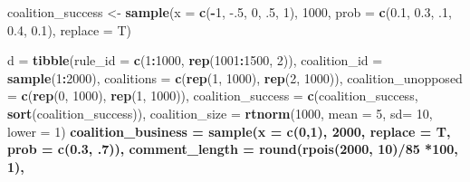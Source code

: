 \documentclass[
      12pt,
        ]{article}
\newenvironment{Shaded}{\begin{snugshade}}{\end{snugshade}}
\newcommand{\DataTypeTok}[1]{\textcolor[rgb]{0.13,0.29,0.53}{#1}}
\newcommand{\DecValTok}[1]{\textcolor[rgb]{0.00,0.00,0.81}{#1}}
\newcommand{\FloatTok}[1]{\textcolor[rgb]{0.00,0.00,0.81}{#1}}
\newcommand{\KeywordTok}[1]{\textcolor[rgb]{0.13,0.29,0.53}{\textbf{#1}}}
\newcommand{\NormalTok}[1]{#1}
\newcommand{\OperatorTok}[1]{\textcolor[rgb]{0.81,0.36,0.00}{\textbf{#1}}}
\newcommand{\StringTok}[1]{\textcolor[rgb]{0.31,0.60,0.02}{#1}}
\begin{document}
\begin{Shaded}
\begin{Highlighting}[]
\NormalTok{coalition_success <-}\StringTok{ }\KeywordTok{sample}\NormalTok{(}\DataTypeTok{x =} \KeywordTok{c}\NormalTok{(}\OperatorTok{-}\DecValTok{1}\NormalTok{, }\FloatTok{-.5}\NormalTok{, }\DecValTok{0}\NormalTok{, }\FloatTok{.5}\NormalTok{, }\DecValTok{1}\NormalTok{), }\DecValTok{1000}\NormalTok{, }\DataTypeTok{prob =} \KeywordTok{c}\NormalTok{(}\FloatTok{0.1}\NormalTok{, }\FloatTok{0.3}\NormalTok{, }\FloatTok{.1}\NormalTok{, }\FloatTok{0.4}\NormalTok{, }\FloatTok{0.1}\NormalTok{), }\DataTypeTok{replace =}\NormalTok{ T)}

\NormalTok{d =}\StringTok{ }\KeywordTok{tibble}\NormalTok{(}\DataTypeTok{rule_id =} \KeywordTok{c}\NormalTok{(}\DecValTok{1}\OperatorTok{:}\DecValTok{1000}\NormalTok{, }\KeywordTok{rep}\NormalTok{(}\DecValTok{1001}\OperatorTok{:}\DecValTok{1500}\NormalTok{, }\DecValTok{2}\NormalTok{)),}
           \DataTypeTok{coalition_id =} \KeywordTok{sample}\NormalTok{(}\DecValTok{1}\OperatorTok{:}\DecValTok{2000}\NormalTok{),}
           \DataTypeTok{coalitions  =} \KeywordTok{c}\NormalTok{(}\KeywordTok{rep}\NormalTok{(}\DecValTok{1}\NormalTok{, }\DecValTok{1000}\NormalTok{), }\KeywordTok{rep}\NormalTok{(}\DecValTok{2}\NormalTok{, }\DecValTok{1000}\NormalTok{)),}
           \DataTypeTok{coalition_unopposed =} \KeywordTok{c}\NormalTok{(}\KeywordTok{rep}\NormalTok{(}\DecValTok{0}\NormalTok{, }\DecValTok{1000}\NormalTok{), }\KeywordTok{rep}\NormalTok{(}\DecValTok{1}\NormalTok{, }\DecValTok{1000}\NormalTok{)),}
           \DataTypeTok{coalition_success =} \KeywordTok{c}\NormalTok{(coalition_success, }\KeywordTok{sort}\NormalTok{(coalition_success)), }
           \DataTypeTok{coalition_size =} \KeywordTok{rtnorm}\NormalTok{(}\DecValTok{1000}\NormalTok{, }\DataTypeTok{mean =} \DecValTok{5}\NormalTok{, }\DataTypeTok{sd=} \DecValTok{10}\NormalTok{, }\DataTypeTok{lower =} \DecValTok{1}\NormalTok{) }\OperatorTok{%
           \DataTypeTok{coalition_business =} \KeywordTok{sample}\NormalTok{(}\DataTypeTok{x =} \KeywordTok{c}\NormalTok{(}\DecValTok{0}\NormalTok{,}\DecValTok{1}\NormalTok{), }\DecValTok{2000}\NormalTok{, }\DataTypeTok{replace =}\NormalTok{ T, }\DataTypeTok{prob =} \KeywordTok{c}\NormalTok{(}\FloatTok{0.3}\NormalTok{, }\FloatTok{.7}\NormalTok{)), }
           \DataTypeTok{comment_length =} \KeywordTok{round}\NormalTok{(}\KeywordTok{rpois}\NormalTok{(}\DecValTok{2000}\NormalTok{, }\DecValTok{10}\NormalTok{)}\OperatorTok{/}\DecValTok{85} \OperatorTok{*}\DecValTok{100}\NormalTok{, }\DecValTok{1}\NormalTok{), }
}
\end{Highlighting}
\end{Shaded}
\end{document}
